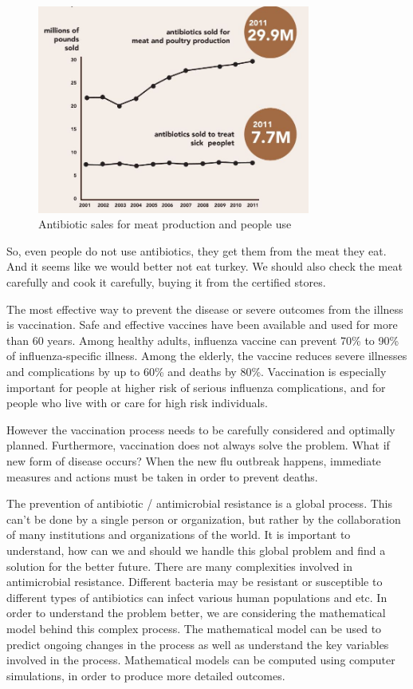 \begin{figure}[H]
  \centering
  \includegraphics[width=0.8\textwidth]{img/Fig12}
  \caption{Antibiotic sales for meat production and people use}
  \label{fig12}
\end{figure}

So, even people do not use antibiotics, they get them from the meat they eat. And it seems like we would better not eat turkey. We should also check the meat carefully and cook it carefully, buying it from the certified stores.

The most effective way to prevent the disease or severe outcomes from the illness is vaccination. Safe and effective vaccines have been available and used for more than 60 years. Among healthy adults, influenza vaccine can prevent 70\% to 90\% of influenza-specific illness. Among the elderly, the vaccine reduces severe illnesses and complications by up to 60\% and deaths by 80\%. Vaccination is especially important for people at higher risk of serious influenza complications, and for people who live with or care for high risk individuals.

However the vaccination process needs to be carefully considered and optimally planned. Furthermore, vaccination does not always solve the problem. What if new form of disease occurs? When the new flu outbreak happens, immediate measures and actions must be taken in order to prevent deaths.

The prevention of antibiotic / antimicrobial resistance is a global process. This can’t be done by a single person or organization, but rather by the collaboration of many institutions and organizations of the world. It is important to understand, how can we and should we handle this global problem and find a solution for the better future. There are many complexities involved in antimicrobial resistance. Different bacteria may be resistant or susceptible to different types of antibiotics can infect various human populations and etc. In order to understand the problem better, we are considering the mathematical model behind this complex process. The mathematical model can be used to predict ongoing changes in the process as well as understand the key variables involved in the process. Mathematical models can be computed using computer simulations, in order to produce more detailed outcomes.


